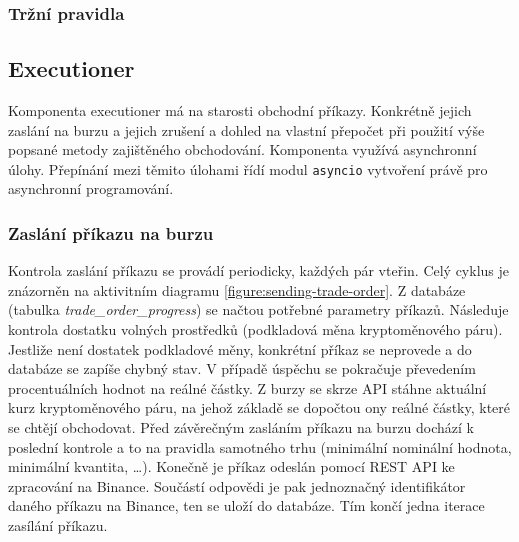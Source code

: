 


\subsubsection{Tržní pravidla}

\subsection{Executioner}
Komponenta executioner má na starosti obchodní příkazy. Konkrétně jejich zaslání na burzu a jejich zrušení a dohled na vlastní přepočet při použití výše popsané metody zajištěného obchodování. Komponenta
využívá asynchronní úlohy. Přepínání mezi těmito úlohami řídí modul \verb|asyncio| vytvoření právě pro asynchronní programování.

\subsubsection{Zaslání příkazu na burzu}
Kontrola zaslání příkazu se provádí periodicky, každých pár vteřin. Celý cyklus je znázorněn na aktivitním diagramu \ref{figure:sending-trade-order}.
Z databáze (tabulka \emph{trade\_order\_progress}) se načtou potřebné parametry příkazů. Následuje kontrola
dostatku volných prostředků (podkladová měna kryptoměnového páru). Jestliže není dostatek podkladové měny, konkrétní příkaz se neprovede a do databáze se zapíše chybný stav. V případě
úspěchu se pokračuje převedením procentuálních hodnot na reálné částky. Z burzy se skrze API stáhne aktuální kurz kryptoměnového páru, na jehož základě se dopočtou ony reálné částky, které
se chtějí obchodovat. Před závěrečným zasláním příkazu na burzu dochází k poslední kontrole a to na pravidla samotného trhu (minimální nominální hodnota, minimální kvantita, \ldots).
Konečně je příkaz odeslán pomocí REST API ke zpracování na Binance. Součástí odpovědi je pak jednoznačný identifikátor daného příkazu na Binance, ten se uloží do databáze. Tím končí jedna
iterace zasílání příkazu.

